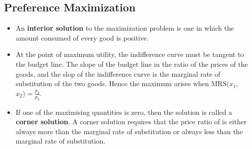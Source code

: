 \documentclass[a4paper]{article}
\begin{document}
\subsection{Preference Maximization}
\begin{itemize}
    \item An \textbf{interior solution} to the maximization problem is one in which the amount consumed of every good is positive. 
    \item At the point of maximum utility, the indifference curve must be tangent to the budget line. The slope of the budget line in the ratio of the prices of the goods, and the slop of the indifference curve is the marginal rate of substitution of the two goods. Hence the maximum arises when MRS$(x_1$, $x_2) = \frac{p_1}{p_2}$.
    \item If one of the maximising quantities is zero, then the solution is called a \textbf{corner solution}. A corner solution requires that the price ratio of is either always more than the marginal rate of substitution or always less than the marginal rate of substitution.
\end{itemize}
\end{document}
